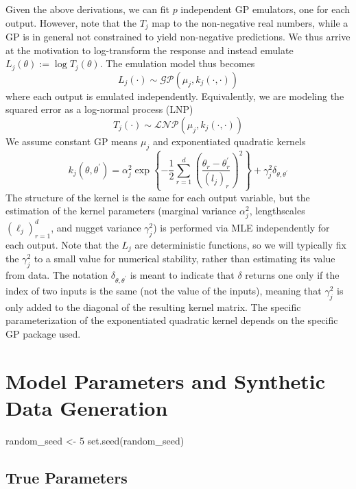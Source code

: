 \documentclass[
]{article}
\newenvironment{Shaded}{\begin{snugshade}}{\end{snugshade}}
\newcommand{\DecValTok}[1]{\textcolor[rgb]{0.00,0.00,0.81}{#1}}
\newcommand{\FunctionTok}[1]{\textcolor[rgb]{0.00,0.00,0.00}{#1}}
\newcommand{\NormalTok}[1]{#1}
\newcommand{\OtherTok}[1]{\textcolor[rgb]{0.56,0.35,0.01}{#1}}
\begin{document}
Given the above derivations, we can fit \(p\) independent GP emulators,
one for each output. However, note that the \(T_j\) map to the
non-negative real numbers, while a GP is in general not constrained to
yield non-negative predictions. We thus arrive at the motivation to
log-transform the response and instead emulate
\(L_j(\theta) := \log T_j(\theta)\). The emulation model thus becomes
\[L_j(\cdot) \sim \mathcal{GP}(\mu_j, k_j(\cdot, \cdot))\] where each
output is emulated independently. Equivalently, we are modeling the
squared error as a log-normal process (LNP)
\[T_j(\cdot) \sim \mathcal{LNP}(\mu_j, k_j(\cdot, \cdot))\] We assume
constant GP means \(\mu_j\) and exponentiated quadratic kernels
\[k_j(\theta, \theta^\prime) = \alpha_j^2 \exp\left\{-\frac{1}{2}\sum_{r = 1}^{d} \left(\frac{\theta_r - \theta_r^\prime}{(l_{j})_r}\right)^2 \right\} + \gamma_j^2\delta_{\theta, \theta^\prime}\]
The structure of the kernel is the same for each output variable, but
the estimation of the kernel parameters (marginal variance
\(\alpha_j^2\), lengthscales \((\ell_j)_{r = 1}^{d}\), and nugget
variance \(\gamma_j^2\)) is performed via MLE independently for each
output. Note that the \(L_j\) are deterministic functions, so we will
typically fix the \(\gamma_j^2\) to a small value for numerical
stability, rather than estimating its value from data. The notation
\(\delta_{\theta, \theta^\prime}\) is meant to indicate that \(\delta\)
returns one only if the index of two inputs is the same (not the value
of the inputs), meaning that \(\gamma_j^2\) is only added to the
diagonal of the resulting kernel matrix. The specific parameterization
of the exponentiated quadratic kernel depends on the specific GP package
used.

\hypertarget{model-parameters-and-synthetic-data-generation}{%
\section{Model Parameters and Synthetic Data
Generation}\label{model-parameters-and-synthetic-data-generation}}

\begin{Shaded}
\begin{Highlighting}[]
\NormalTok{random\_seed }\OtherTok{\textless{}{-}} \DecValTok{5}
\FunctionTok{set.seed}\NormalTok{(random\_seed)}
\end{Highlighting}
\end{Shaded}

\hypertarget{true-parameters}{%
\subsection{True Parameters}\label{true-parameters}}
\end{document}
